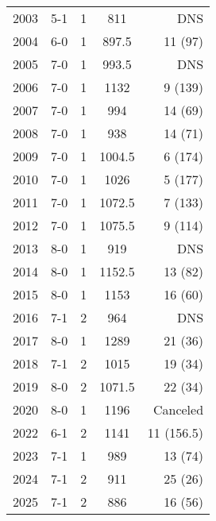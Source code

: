 \begin{longtable}{lcccr}
2003 & 5-1 & 1 & 811 & DNS \\
2004 & 6-0 & 1 & 897.5 & 11 (97) \\
2005 & 7-0 & 1 & 993.5 & DNS \\
2006 & 7-0 & 1 & 1132 & 9 (139) \\
2007 & 7-0 & 1 & 994 & 14 (69) \\
2008 & 7-0 & 1 & 938 & 14 (71) \\
2009 & 7-0 & 1 & 1004.5 & 6 (174) \\
2010 & 7-0 & 1 & 1026 & 5 (177) \\
2011 & 7-0 & 1 & 1072.5 & 7 (133) \\
2012 & 7-0 & 1 & 1075.5 & 9 (114) \\
2013 & 8-0 & 1 & 919 & DNS \\
2014 & 8-0 & 1 & 1152.5 & 13 (82) \\
2015 & 8-0 & 1 & 1153 & 16 (60) \\
2016 & 7-1 & 2 & 964 & DNS \\
2017 & 8-0 & 1 & 1289 & 21 (36) \\
2018 & 7-1 & 2 & 1015 & 19 (34) \\
2019 & 8-0 & 2 & 1071.5 & 22 (34) \\
2020 & 8-0 & 1 & 1196 & Canceled \\
2022 & 6-1 & 2 & 1141 & 11 (156.5) \\
2023 & 7-1 & 1 & 989 & 13 (74) \\
2024 & 7-1 & 2 & 911 & 25 (26) \\
2025 & 7-1 & 2 & 886 & 16 (56) \\
\bottomrule
\end{longtable}

\clearpage
\begin{table}[htbp]
\centering
\caption*{\textbf{\textcolor{teamprimary}{Athena Swimming \& Diving Head Coaches}}}
\end{table}

